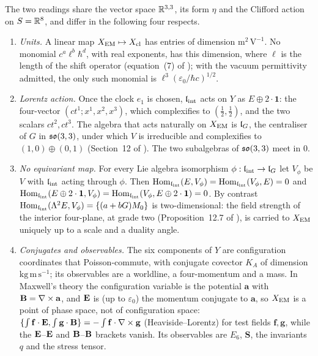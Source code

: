 \begin{theorem}
\label{r1:thm:type}
The two readings share the vector space $\mathbb{R}^{3,3}$, its form $\eta$ and the Clifford action on $S=\mathbb{R}^8$, and differ in the following
four respects.
\begin{enumerate}[label=(\roman*),leftmargin=2.2em]
\item \emph{Units.} A linear map $X_{\rm EM}\mapsto X_{\rm cl}$ has entries of dimension $\mathrm{m^2\,V^{-1}}$. No monomial
$c^a\ell^b\hbar^d$, with real exponents, has this dimension, where $\ell$ is the length of the shift operator (equation~(7) of
\cite{ES17}); with the vacuum permittivity admitted, the only such monomial is $\ell^3(\varepsilon_0/\hbar c)^{1/2}$.
\item \emph{Lorentz action.} Once the clock $e_1$ is chosen, $\mathfrak l_{\rm int}$ acts on $Y$ as $E\oplus2\cdot\mathbf1$: the four-vector
$(ct^1;x^1,x^2,x^3)$, which complexifies to $(\tfrac12,\tfrac12)$, and the two scalars $ct^2,ct^3$. The algebra that acts naturally on
$X_{\rm EM}$ is $\mathfrak l_G$, the centraliser of $G$ in $\mathfrak{so}(3,3)$, under which $V$ is irreducible and complexifies to $(1,0)\oplus(0,1)$
(Section~12 of \cite{ES17}). The two subalgebras of $\mathfrak{so}(3,3)$ meet in $0$.
\item \emph{No equivariant map.} For every Lie algebra isomorphism $\phi:\mathfrak l_{\rm int}\to\mathfrak l_G$ let $V_\phi$ be $V$ with $\mathfrak l_{\rm int}$ acting through
$\phi$. Then $\operatorname{Hom}_{\mathfrak l_{\rm int}}(E,V_\phi)=\operatorname{Hom}_{\mathfrak l_{\rm int}}(V_\phi,E)=0$ and $\operatorname{Hom}_{\mathfrak l_{\rm int}}(E\oplus2\cdot\mathbf1,V_\phi)=\operatorname{Hom}_{\mathfrak l_{\rm int}}(V_\phi,E\oplus2\cdot\mathbf1)=0$.
By contrast $\operatorname{Hom}_{\mathfrak l_{\rm int}}(\Lambda^2E,V_\phi)=\{(a+bG)M_0\}$ is two-dimensional: the field strength of the interior four-plane, at
grade two (Proposition~12.7 of \cite{ES17}), is carried to $X_{\rm EM}$ uniquely up to a scale and a duality angle.
\item \emph{Conjugates and observables.} The six components of $Y$ are configuration coordinates that Poisson-commute, with conjugate
covector $K_A$ of dimension $\mathrm{kg\,m\,s^{-1}}$; its observables are a worldline, a four-momentum and a mass. In Maxwell's theory the
configuration variable is the potential $\mathbf a$ with $\mathbf B=\nabla\times\mathbf a$, and $\mathbf E$ is (up to $\varepsilon_0$) the momentum conjugate
to $\mathbf a$, so $X_{\rm EM}$ is a point of phase space, not of configuration space: $\{\int\mathbf f\cdot\mathbf E,\int\mathbf g\cdot\mathbf B\}=-\int\mathbf
f\cdot\nabla\times\mathbf g$ (Heaviside--Lorentz) for test fields $\mathbf f,\mathbf g$, while the $\mathbf E$--$\mathbf E$ and $\mathbf B$--$\mathbf B$ brackets vanish. Its
observables are $E_6$, $\mathbf S$, the invariants $q$ and the stress tensor.
\end{enumerate}
\end{theorem}

